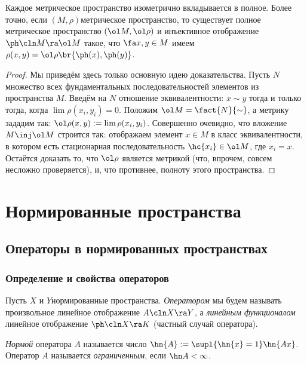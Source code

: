 \documentclass[a4paper]{article}
\begin{document}
\begin{theorem}[О пополнении]
Каждое метрическое пространство изометрично вкладывается в полное. Более точно, если $(M,\rho)$\т метрическое
пространство, то существует полное метрическое пространство $(\ol M, \ol \rho)$ и инъективное отображение
$\ph\cln M \ra \ol M$ такое, что $\fa x,y \in M$ имеем $\rho(x,y) = \ol \rho\br{\ph(x), \ph(y)}$.
\end{theorem}
\begin{proof}
Мы приведём здесь только основную идею доказательства.
Пусть $N$\т множество всех фундаментальных последовательностей элементов из пространства $M$.
Введём на $N$ отношение эквивалентности: $x \sim y$ тогда и только тогда, когда
$\lim \rho(x_i,y_i) = 0$. Положим $\ol M = \fact{N}{\sim}$, а метрику зададим так:
$\ol\rho(x,y) := \lim \rho(x_i,y_i)$. Совершенно очевидно, что вложение $M \inj \ol M$ строится так:
отображаем элемент $x\in M$ в класс эквивалентности, в котором есть
стационарная последовательность $\hc{x_i} \in \ol M$, где $x_i = x$.
Остаётся доказать то, что $\ol \rho$ является метрикой (что, впрочем, совсем несложно проверяется),
и, что противнее, полноту этого пространства.
\end{proof}

\section{Нормированные пространства}

\subsection{Операторы в нормированных пространствах}

\subsubsection{Определение и свойства операторов}

\begin{df}
Пусть $X$ и $Y$\т нормированные пространства. \emph{Оператором} мы будем называть
произвольное линейное отображение $A\cln X \ra Y$, а \emph{линейным функционалом}\т
линейное отображение $\ph\cln X \ra K$ (частный случай оператора).
\end{df}

\begin{df}
\emph{Нормой} оператора $A$ называется число $\hn{A} := \supl{\hn{x} = 1}\hn{Ax}$.
Оператор $A$ называется \emph{ограниченным}, если $\hn A < \infty$.
\end{df}
\end{document}
